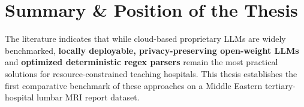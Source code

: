 \section{Summary \& Position of the Thesis}
The literature indicates that while cloud-based proprietary LLMs are widely benchmarked, \textbf{locally deployable, privacy-preserving open-weight LLMs} and \textbf{optimized deterministic regex parsers} remain the most practical solutions for resource-constrained teaching hospitals. This thesis establishes the first comparative benchmark of these approaches on a Middle Eastern tertiary-hospital lumbar MRI report dataset.
